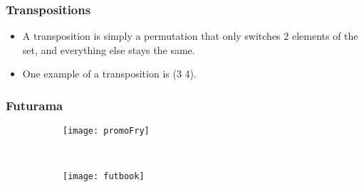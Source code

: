 \documentclass{beamer}
\begin{document}
\begin{frame}
  \frametitle{Transpositions}


  \begin{itemize}
  \item A transposition is simply a permutation that only switches 2 elements of the set, and everything else stays the same. 

\item One example of a transposition is (3 4).
  \end{itemize}
  
\end{frame}

 


















\begin{frame}
  \frametitle{Futurama}

\begin{figure}
        \centering
        \begin{subfigure}[b]{0.25\textwidth}
                \texttt{[image: promoFry]}
                \label{fig:gull}
        \end{subfigure}%
        ~ %
        \begin{subfigure}[b]{0.25\textwidth}
                \texttt{[image: futbook]}
                \label{fig:tiger}
        \end{subfigure}
 \end{figure}

\end{frame}
\end{document}
